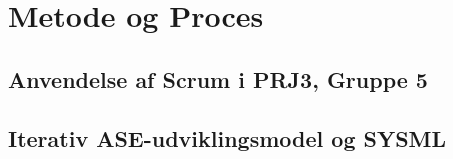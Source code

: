 \documentclass[Rapport/Rapport_main.tex]{subfiles}
\begin{document}
\section{Metode og Proces}
\subsection{Anvendelse af Scrum i PRJ3, Gruppe 5}
\subsection{Iterativ ASE-udviklingsmodel og SYSML}
\end{document}
